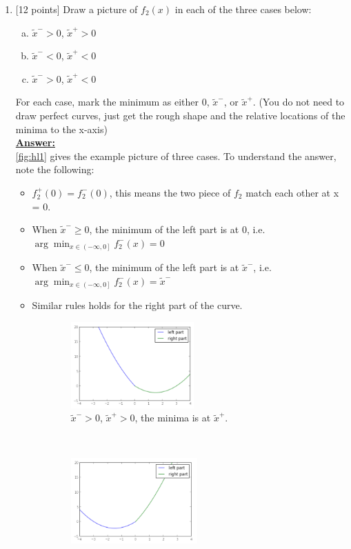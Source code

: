 \documentclass{article}
\newenvironment{qparts}{\begin{enumerate}[1.]}{\end{enumerate}}
\begin{document}
\begin{qparts}
\item {[}12 points{]} 
Draw a picture of $f_2(x)$ in each of the three cases below:
\begin{enumerate}[(a)]
\item $\tilde{x}^->0$, $\tilde{x}^+>0$
\item $\tilde{x}^-<0$, $\tilde{x}^+<0$
\item $\tilde{x}^->0$, $\tilde{x}^+<0$
\end{enumerate}
For each case, mark the minimum as either 0, $\tilde{x}^-$, or $\tilde{x}^+$. (You do not need to draw perfect curves, just get the rough shape and the relative locations of the minima to the x-axis)\\
\underline{\textbf{Answer:}}\\
\cref{fig:hl1} gives the example picture of three cases. To understand the answer, note the following:
\begin{itemize}
\item $f^+_2(0)=f^-_2(0)$, this means the two piece of $f_2$ match each other at x = 0.
\item When $\tilde{x}^-\geq 0$, the minimum of the left part is at 0, i.e. $\arg\min_{x\in \left(-\infty, 0\right]}f_2^-(x)=0$
\item When $\tilde{x}^-\leq 0$, the minimum of the left part is at $\tilde{x}^-$, i.e. $\arg\min_{x\in \left(-\infty, 0\right]}f_2^-(x)=\tilde{x}^-$
\item Similar rules holds for the right part of the curve.
\end{itemize}
\begin{figure}[!htb]
    \centering
    \begin{subfigure}[t]{0.31\textwidth}
        \centering
        \includegraphics[height=1.3in]{fig/fig-han-1.PNG}
        \caption{$\tilde{x}^->0$, $\tilde{x}^+>0$, the minima is at $\tilde{x}^+$.}
    \end{subfigure}%
    ~
    \begin{subfigure}[t]{0.31\textwidth}
        \centering
        \includegraphics[height=1.3in]{fig/fig-han-2.PNG}

\end{subfigure}
\end{figure}
\end{qparts}
\end{document}
